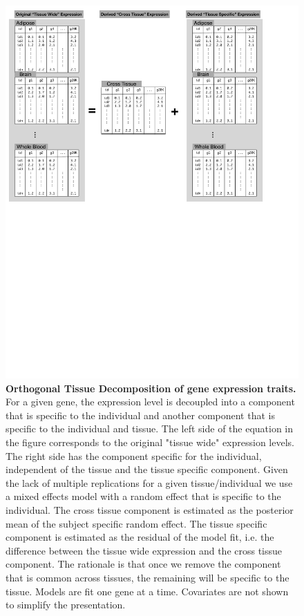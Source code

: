 \documentclass[10pt,letterpaper]{article}
\begin{document}
\begin{figure}[H]
\includegraphics[width=\textwidth]{Figures/OTD.pdf}
\caption{\textbf{Orthogonal Tissue Decomposition of gene expression traits.} For a given gene, the expression level is decoupled into a component that is specific to the individual and another component that is specific to the individual and tissue. The left side of the equation in the figure corresponds to the original "tissue wide" expression levels. The right side has the component specific for the individual, independent of the tissue and the tissue specific component. Given the lack of multiple replications for a given tissue/individual we use a mixed effects model with a random effect that is specific to the individual. The cross tissue component is estimated as the posterior mean of the subject specific random effect. The tissue specific component is estimated as the residual of the model fit, i.e. the difference between the tissue wide expression and the cross tissue component. The rationale is that once we remove the component that is common across tissues, the remaining will be specific to the tissue. Models are fit one gene at a time. Covariates are not shown to simplify the presentation.}
\label{fig-OTD}
\end{figure}
\end{document}
